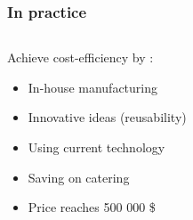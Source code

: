 \begin{frame}
    \frametitle{In practice}
    \begin{columns}
        \begin{column}{55mm}
            Achieve cost-efficiency by :
            \begin{itemize}
                \item<1-> In-house manufacturing 
                \item<2-> Innovative ideas (reusability)
                \item<3-> Using current technology
                \item<4> Saving on catering
                \item<6-> Price reaches 500 000 \$ 
            \end{itemize}
        \end{column}
        \begin{column}{65mm}
        \end{column}
    \end{columns}

\end{frame}
